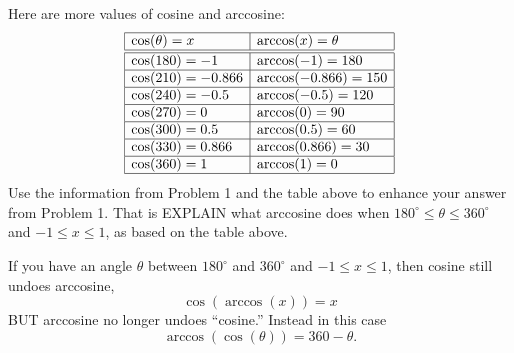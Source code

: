 \documentclass[noauthor,nooutcomes,handout,hints]{ximera}
\begin{document}
\begin{question}
  Here are more values of cosine and arccosine:
  \[
  \begin{array}{|l|l|}
    \hline
    \cos(\theta) =x      & \arccos(x) = \theta\\ \hline\hline
    \cos(180) =-1      & \arccos(-1) = 180\\ \hline
    \cos(210) = -0.866 & \arccos(-0.866) = 150\\ \hline
    \cos(240) = -0.5   & \arccos(-0.5) = 120\\ \hline
    \cos(270) = 0      & \arccos(0) = 90\\ \hline
    \cos(300) = 0.5     & \arccos(0.5) = 60\\ \hline
    \cos(330) = 0.866   & \arccos(0.866) = 30\\ \hline
    \cos(360)  = 1     & \arccos(1) = 0 \\    \hline
  \end{array}
  \]
  Use the information from Problem 1 and the table above to enhance
  your answer from Problem 1. That is EXPLAIN what arccosine does when
  $180^\circ \le \theta \le 360^\circ$ and $-1\le x\le 1$, as based on
  the table above.
  \begin{freeResponse}
    If you have an angle $\theta$ between $180^\circ$ and $360^\circ$
    and $-1\le x\le 1$, then cosine still undoes arccosine,
    \[
    \cos(\arccos(x)) = x
    \]
    BUT arccosine no longer undoes ``cosine.'' Instead in this case
    \[
    \arccos(\cos(\theta)) = 360-\theta.
    \]
  \end{freeResponse}
\end{question}
\mynewpage
\end{document}
